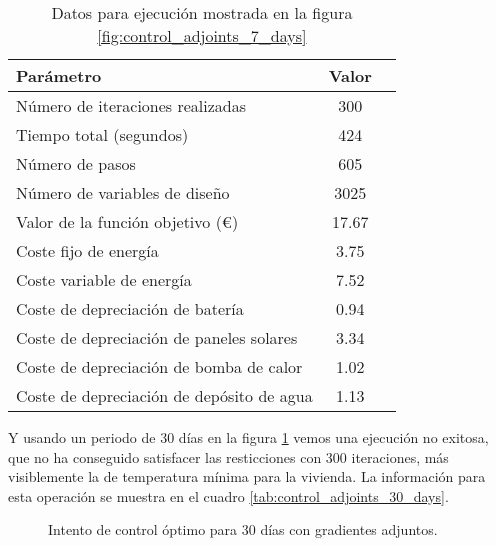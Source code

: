 \begin{table}[ht]
	\centering
	\caption{Datos para ejecución mostrada en la figura \ref{fig:control_adjoints_7_days}}
	\label{tab:control_adjoints_7_days}
	\begin{tabular}{@{}lcc@{}}
		\toprule
		Parámetro                                 & Valor \\
		\midrule
		Número de iteraciones realizadas          & 300   \\
		Tiempo total (segundos)                   & 424   \\
		Número de pasos                           & 605   \\
		Número de variables de diseño             & 3025  \\
		\midrule
		Valor de la función objetivo (€)          & 17.67 \\
		\midrule
		Coste fijo de energía                     & 3.75  \\
		Coste variable de energía                 & 7.52  \\
		Coste de depreciación de batería          & 0.94  \\
		Coste de depreciación de paneles solares  & 3.34  \\
		Coste de depreciación de bomba de calor   & 1.02  \\
		Coste de depreciación de depósito de agua & 1.13  \\
		\bottomrule
	\end{tabular}
\end{table}

Y usando un periodo de 30 días en la figura \ref{fig:control_adjoints_30_days}
vemos una ejecución no exitosa, que no ha conseguido satisfacer las
resticciones con 300 iteraciones, más visiblemente la de temperatura mínima
para la vivienda. La información para esta operación se muestra en el cuadro
\ref{tab:control_adjoints_30_days}.

\begin{figure}[h] \centering
	\centering
	
	\caption{Intento de control óptimo para 30 días con gradientes adjuntos.}
	\label{fig:control_adjoints_30_days}
\end{figure}

